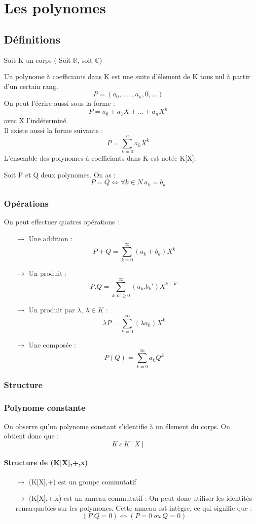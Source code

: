\chapter{Les polynomes}
\section{Définitions}
Soit K un corps ( Soit $\mathbb{R}$, soit $\mathbb{C}$)
\begin{de}
Un polynome à coefficiants dans K est une suite d'élement de K tous nul à partir d'un certain rang.
$$P=(a_0,.....,a_n,0,...)$$
On peut l'écrire aussi sous la forme :
$$P=a_0+a_1X+...+a_nX^n$$
avec X l'indéterminé.\\
Il existe aussi la forme suivante :
$$P = \sum_{k=0}^n a_kX^k$$
L'ensemble des polynomes à coefficiants dans K est notée K[X].
\end{de}
Soit P et Q deux polynomes. On as : 
$$P = Q \Leftrightarrow \forall k \in N~ a_k=b_k$$
\subsection{Opérations}
On peut effectuer quatres opérations :
\begin{itemize}
 \item[$\rightarrow$] Une addition : $$P+Q = \sum_{k=0}^{\infty}(a_k+b_k)X^k$$
 \item[$\rightarrow$] Un produit : $$P.Q = \sum_{k,k'\geq0}^{\infty}(a_k.b_k')X^{k+k'}$$
 \item[$\rightarrow$] Un produit par $\lambda$, $\lambda \in K$ : $$\lambda P = \sum_{k=0}^{\infty}(\lambda a_k)X^k$$
\item[$\rightarrow$] Une composée : $$P(Q) = \sum_{k=0}^{\infty}a_k Q^k$$
\end{itemize}
\subsection{Structure}
\subsection{Polynome constante}
On observe qu'un polynome constant s'identifie à un élement du corps. On obtient donc que :
$$K~ c~ K[X]$$
\subsubsection{Structure de (K[X],+,x)}
\begin{itemize}
 \item[$\rightarrow$] (K[X],+) est un groupe commutatif
 \item[$\rightarrow$] (K[X],+,x) est un anneau commutatif : On peut donc utiliser les identités remarquables sur les polymones. Cette anneau est intègre, ce qui signifie que : $$(P.Q = 0) \Leftrightarrow (P=0~ ou~ Q=0)$$

\end{itemize}

